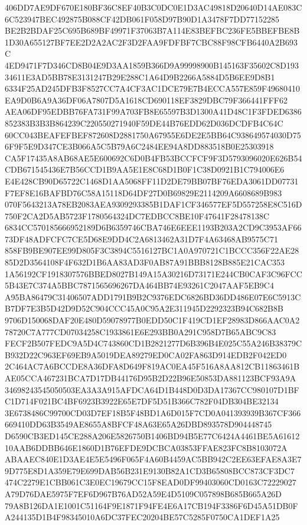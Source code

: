\documentclass[UTF8,fontset=fandol,zihao=-4,a4paper]{ctexart}
\begin{document}
{{406DD7AE9DF670E180BF36C8EF40B3C0DC0E1D3AC49818D20640D14AE083C6C523947BEC492875B088CF42DB061F058D97B90D1A3478F7DD77152285
BE2B2BDAF25C695B689BF49971F37063B7A114E83BEFBC236FE5BBEFBE8B1D30A655127BF7EE2D2A2AC2F3D2FAA9FDFBF7CBC88F98CFB6440A2B693C
4ED9471F7D346CD8B04E9D3AA1859B366D9A99998900B145163F35602C8D19334611E3AD5BB78E3131247B29E288C1A64D9B2266A5884D5B6EE9D8B1
6334F25AD245DFB3F8527CC7A4CF3AC1DCE79E7B4ECCA557E859F49680410EA9D0B6A9A36DF06A7807D5A1618CD690118EF3829DBC79F366441FFF62
AEA06DF95EDBB76FA731F99A703FB8E65597B3D1300A41D48C1F3FDED6386852383B3B3B864239C220550271940F59DE44B76EDD62D036DCDFB4C64C
60CC043BEAFEFBEF872608D2881750A67955E6DE2E5BB64C938649574030D756F9F5E9D347CE3B066A5C5B79A6C2484EE94A8DD883518B0E25303918
CA5F17435A8AB68AE5E600692C6D0B4FB53BCCFCF9F3D5793096020E626B54CDB671545436E7B56CCD1B9AA5E1E8C68D1B0F1C38D0921B1C794006E6
E4E428CB90D65722C1468D1AA5068FF11D2DE79BB07BF76EDA3061DD07731F7EF8E16BAFBD76C58A15118D64DF27D0B69829E2114209A6608689B983
070F5643213A78EB2083AEA9309293385B1DAF1CF346577EF5D557258E8C516D750F2CA2D5AB5723F1780564324DC7EDBCC8BE10F47641F28478138C
6834CC570185666952189D6B6359746CBA746E6EEE1193B203A2CD9C3953AF6673DF48ADFCFC7CE5D68E9DD4C2A6813462A31D7F4A63468AB9575C71
858FB9BE907EE99D805F3C3894C5516127BC1A0A970721C1BCCC356F22AE2885D2D3564108F4F632D1B6AA83AD3F0AB87A91BBB8128B885E21CAC353
1A56192CF1918307576BBED8027B149A15A30216D73171E244CB0CAF3C96FCC5B43E7C374A5BBC7871565696267DA464BB74E93261C2047AAF5EB9C4
A95BA86479C31406507ADD1791B9B2C9376EDC6826BD36DD486E07E6C5913CB7DF7E3B5D42D9D52C904CCC45A0C95A2E311945D2292323B94C682B8B
9706D150068DAF20E480D59078977B0EDD50C1F419CD1EF28983D866AAC0A278720C7A777CD07034258C1933861E6E293BB0A291C958D7B65ABC9C83
FECF2B507FEDC9A5D4C743860CD1B2821277D6B396B4E025C55A246B38379CB932D22C963EF69EB9A5019DEA89279ED0CA02FA863D914EDB2F042ED0
2C464AC7A6BCCDE8A36DFA8D649F819AC0EA45F516A8AA812CB11863461BAE05CCA467231BCA7D17DB44176D95B2D22B96E50853DA881123BCF93A9A
34698243545050503EA3A3A915AFDCA64D1B448D0D3DA17367CC980107D1BFC1D714F021BC4BF6923B3922E65E7DF5D51B366C782F04DB304BE32134
3E6738486C99700CD03D7EF18B5F48BD1A6D015F7CD0A041393939B367CF366669410DD63B3549AE8655A8BFCF48A63E65A26DBD893578D904448745
D6590CB3ED145CE288A206E5826750B1406BD94B5E77C6424A4461BE5A6161210AAB6DDBB646E1860D1B76EFDE9DCBCA03853FFAE823FC8B8103072A
ABAAEC840E1D3AE4E5E5496F065F4A60B4459AC5BB942C2EE63EFAE8A3E79D775E8D1A359E79E699DAB56B231E9130B82A1CD3B65808BCC873CF3DC7
474C2279E1CBB061C3E0EC19679CC15F8EAD0DF99403060CD0163C72229027A79D76DAE5975F7EF6D967B76AD52A59E4D5109C057898B685B665A26D
79A8B126DA1E1001C51164F9E1871F94FE4E6A17CB194F3386F6D45A51DB0FA244135D1B4F98345010A6DC37FEC20204BE57C5285F0750CA1DEF1A25
}}
\end{document}
